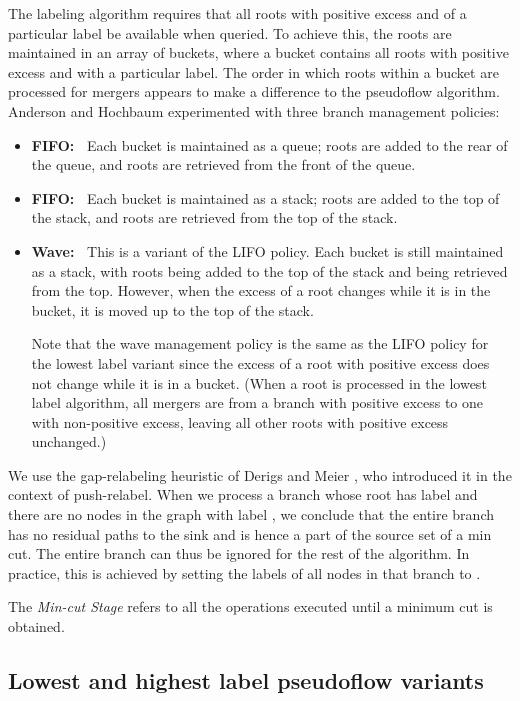 \documentclass{article}
\newcounter{gap}
\begin{document}
 The labeling algorithm requires that all roots with positive excess and of a particular label be available when queried. To achieve this, the roots are maintained in an array of buckets, where a bucket contains all roots with positive excess and with a particular label. The order in which roots within a bucket are processed for mergers appears to make a difference to the pseudoflow algorithm. Anderson and Hochbaum \cite{AndH02} experimented with three branch management policies:
\begin{itemize}
\item {\bf FIFO:~} Each bucket is maintained as a queue; roots are added to the rear of the queue, and roots are retrieved from the front of the queue.
\item {\bf FIFO:~} Each bucket is maintained as a stack; roots are added to the top of the stack, and roots are retrieved from the top of the stack.
\item {\bf Wave:~} This is a variant of the LIFO policy.  Each bucket is still maintained as a stack, with roots being added to the top of the stack and being retrieved from the top.  However, when the excess of a root changes while it is in the bucket, it is moved up to the top of the stack.

Note that the wave management policy is the same as the LIFO policy for the lowest label variant since the excess of a root with positive excess does not change while it is in a bucket. (When a root is processed in the lowest label algorithm, all mergers are from a branch with positive excess to one with non-positive excess, leaving all other roots with positive excess unchanged.)
\end{itemize}

 We use the gap-relabeling heuristic of Derigs and Meier \cite{DerM89}, who introduced it in the context of push-relabel. When we process a branch whose root has label  and there are no nodes in the graph with label , we conclude that the entire branch has no residual paths to the sink and is hence a part of the source set of a min cut. The entire branch can thus be ignored for the rest of the algorithm. In practice, this is achieved by setting the labels of all nodes in that branch to .

The {\em Min-cut Stage} refers to all the operations executed until a minimum cut is obtained.

\subsection{Lowest and highest label pseudoflow variants}
\end{document}
